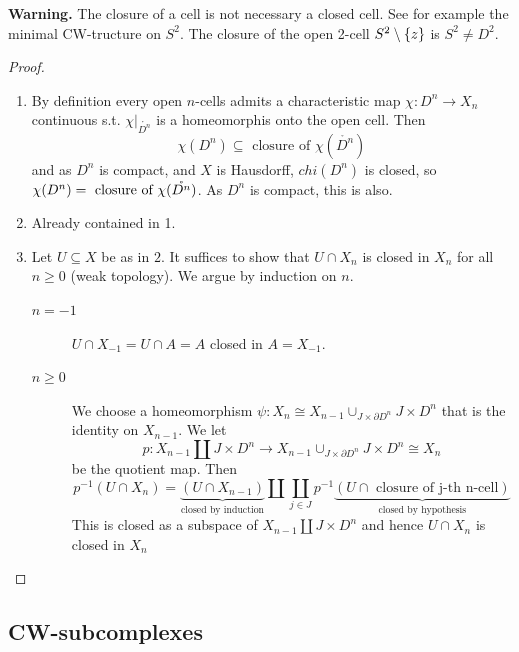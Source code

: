 \documentclass{TemplateLecture}
\begin{document}
\textbf{Warning.} The closure of a cell is not necessary a closed cell.
See for example the minimal CW-tructure on \(S^2\). The closure of the open 2-cell \(S^2\setminus \{z\}\) is \(S^2 \neq D^2\).

\begin{proof}\leavevmode
    \begin{enumerate}
        \item By definition every open \(n\)-cells admits a characteristic map \(\chi\colon D^n \to X_n\) continuous s.t. \(\chi\rvert_{\mathring{D^n}}\) is a homeomorphis onto the open cell. Then
        \[\chi(D^n) \subseteq \text{ closure of } \chi(\mathring{D^n})\]
        and as \(D^n\) is compact, and \(X\) is Hausdorff, \(chi(D^n)\) is closed, so \(\chi(D^n) = \text{ closure of } \chi(\mathring{D^n})\). As \(D^n\) is compact, this is also.

        \item Already contained in 1.
        
        \item Let \(U\subseteq X\) be as in \(2\). It suffices to show that \(U\cap X_n\) is closed in \(X_n\) for all \(n \geq 0\) (weak topology). We argue by induction on \(n\).
        \begin{description}
            \item[\(n = -1\)] \(U\cap X_{-1} = U\cap A = A\) closed in \(A = X_{-1}\).
            \item[\(n \geq 0\)]  We choose a homeomorphism \(\psi\colon X_n \cong X_{n-1} \cup_{J\times \partial D^n} J\times D^n\) that is the identity on \(X_{n-1}\). We let
            \[p\colon X_{n-1} \amalg J\times D^n \to X_{n-1} \cup_{J\times \partial D^n} J\times D^n \cong X_n\]
            be the quotient map. Then
            \[p^{-1}(U\cap X_n) = \underbrace{(U\cap X_{n-1})}_{\text{closed by induction}} \amalg \coprod_{j \in J} p^{-1}\underbrace{(U\cap \text{ closure of j-th n-cell})}_{\text{closed by hypothesis}}\]
            This is closed as a subspace of \( X_{n-1} \amalg J\times D^n\) and hence \(U\cap X_n\) is closed in \(X_n\)
        \end{description}
    \end{enumerate}
\end{proof}

\subsection{CW-subcomplexes}
\end{document}
